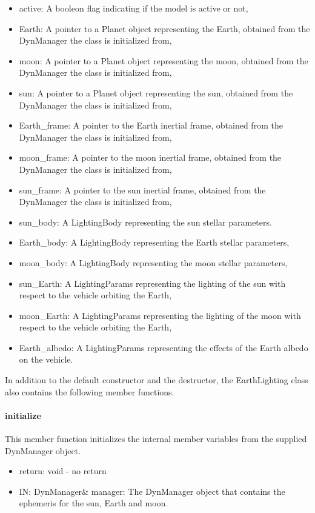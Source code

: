\begin{itemize}
\item{active:} A booleon flag indicating if the model is active or not,
\item{Earth:} A pointer to a Planet object representing the Earth, obtained
from the DynManager the class is initialized from,
\item{moon:} A pointer to a Planet object representing the moon, obtained
from the DynManager the class is initialized from,
\item{sun:} A pointer to a Planet object representing the sun, obtained
from the DynManager the class is initialized from,
\item{Earth\_frame:} A pointer to the Earth inertial frame, obtained
from the DynManager the class is initialized from,
\item{moon\_frame:} A pointer to the moon inertial frame, obtained
from the DynManager the class is initialized from,
\item{sun\_frame:} A pointer to the sun inertial frame, obtained
from the DynManager the class is initialized from,
\item{sun\_body:} A LightingBody representing the sun stellar parameters.
\item{Earth\_body:} A LightingBody representing the Earth
stellar parameters,
\item{moon\_body:} A LightingBody representing the moon stellar parameters,
\item{sun\_Earth:} A LightingParams representing the lighting of the sun
with respect to the vehicle orbiting the Earth,
\item{moon\_Earth:} A LightingParams representing the lighting of the moon
with respect to the vehicle orbiting the Earth,
\item{Earth\_albedo:} A LightingParams representing the effects of the
Earth albedo on the vehicle.
\end{itemize}

In addition to the default constructor and the destructor,
the EarthLighting class also contains the following member functions.

\paragraph{initialize}

This member function initializes the internal member variables from the
supplied DynManager object.
\begin{itemize}
\item{return:} void - no return
\item{IN:} DynManager\& manager: The DynManager object that contains the
ephemeris for the sun, Earth and moon.
\end{itemize}

